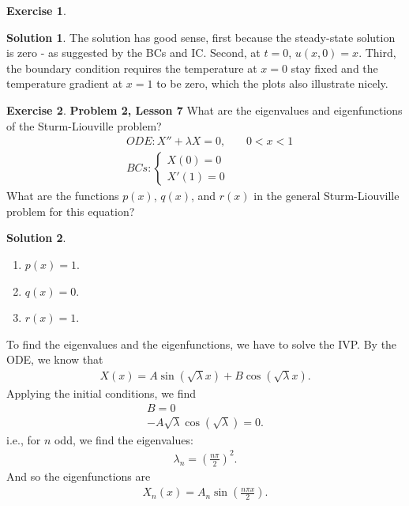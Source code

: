 \documentclass{book}
\theoremstyle{definition}
\newtheorem*{exer*}{Exercise}
\newtheorem*{sln*}{Solution}
\begin{document}
\begin{exer*}
\begin{sln*}
		\noindent The solution has good sense, first because the steady-state solution is zero - as suggested by the BCs and IC. Second, at $t=0$, $u(x,0) = x$. Third, the boundary condition requires the temperature at $x=0$ stay fixed and the temperature gradient at $x=1$ to be zero, which the plots also illustrate nicely. 
	\end{sln*}
	
\end{exer*}
\newpage









\begin{exer*}\textbf{Problem 2, Lesson 7}
	What are the eigenvalues and eigenfunctions of the Sturm-Liouville problem?
	\begin{align*}
	&ODE: X'' + \lambda X = 0,\,\,\,\,\,\,\,\,\,\,\, 0<x<1\\
	&BCs:  
	\begin{cases}
	X(0) = 0\\
	X'(1) = 0
	\end{cases}
	\end{align*}
	What are the functions $p(x)$, $q(x)$, and $r(x)$ in the general Sturm-Liouville problem for this equation? 
	
	\begin{sln*} 
		$\,$
		\begin{enumerate}
			\item $p(x) = 1$.
			\item $q(x) = 0$.
			\item $r(x) = 1$.
		\end{enumerate}
		To find the eigenvalues and the eigenfunctions, we have to solve the IVP. By the ODE, we know that 
		\begin{align*}
		X(x) = A\sin(\sqrt{\lambda}x) + B\cos(\sqrt{\lambda} x).
		\end{align*}
		Applying the initial conditions, we find 
		\begin{align*}
		B = 0\\
		-A\sqrt{\lambda}\cos(\sqrt{\lambda}) = 0.
		\end{align*}
		i.e., for $n$ odd, we find the eigenvalues:
		\begin{align*}
		\lambda_n = \left( \frac{n\pi}{2} \right)^2.
		\end{align*}
		And so the eigenfunctions are
		\begin{align*}
		X_n(x) = A_n\sin\left( \frac{n\pi x}{2} \right).
		\end{align*}
	\end{sln*}
\end{exer*}
\newpage
\end{document}
